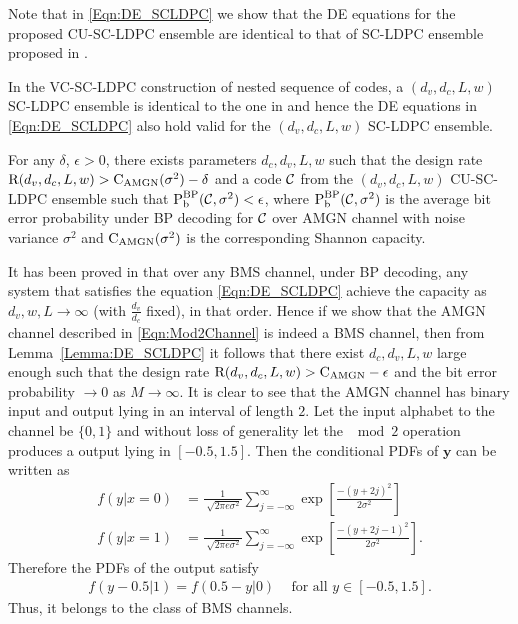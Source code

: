 \documentclass[journal,draftcls,onecolumn,12pt,twoside]{IEEEtran}
\begin{document}
Note that in \eqref{Eqn:DE_SCLDPC} we show that the DE equations for the proposed CU-SC-LDPC ensemble are identical to that of SC-LDPC ensemble proposed in \cite{KudekarUrbanke11,kudekaruniversal}.
\begin{Remark}\label{Rmk:Same_DE}
In the VC-SC-LDPC construction of nested sequence of codes, a $(d_{v},d_{c},L,w)$ SC-LDPC ensemble is identical to the one in \cite{kudekaruniversal} and hence the DE equations in \eqref{Eqn:DE_SCLDPC} also hold valid for the $(d_{v},d_{c},L,w)$ SC-LDPC ensemble.
\end{Remark}

\begin{lemma}\label{Lemma:BMSProof1}
For any $\delta$, $\epsilon>0$, there exists parameters $d_{c},d_{v},L,w$ such that the design rate $\text{R}(d_{v},d_{c},L,w)>\text{C}_{\text{AMGN}}(\sigma^{2})-\delta$ and a code $\mathcal{C}$ from the  $(d_{v},d_{c},L,w)$ CU-SC-LDPC  ensemble such that $\text{P}_{\text{b}}^{\text{BP}}(\mathcal{C},\sigma^{2})< \epsilon$, where $\text{P}_{\text{b}}^{\text{BP}}(\mathcal{C},\sigma^{2})$ is the average bit error probability under BP decoding for $\mathcal{C}$ over AMGN channel with noise variance $\sigma^{2}$ and $\text{C}_{\text{AMGN}}(\sigma^{2})$ is the corresponding Shannon capacity.
\end{lemma}
\begin{IEEEproof}
It has been proved in \cite{kudekaruniversal,kumar2012proof} that over any BMS channel, under BP decoding, any system that satisfies the equation \eqref{Eqn:DE_SCLDPC} achieve the capacity as $d_{v},w,L \rightarrow \infty$ (with $\frac{d_{v}}{d_{c}}$ fixed), in that order. Hence if we show that the AMGN channel described in \eqref{Eqn:Mod2Channel} is indeed a BMS channel, then from Lemma~\ref{Lemma:DE_SCLDPC} it follows that there exist $d_{c},d_{v},L,w$ large enough such that the design rate $\text{R}(d_{v},d_{c},L,w)>\text{C}_{\text{AMGN}}-\epsilon$ and the bit error probability $\rightarrow 0$  as $M\rightarrow \infty$. It is clear to see that the AMGN channel has binary input and output lying in an interval of length $2$. Let the input alphabet to the channel be $\{0,1\}$ and without loss of generality let the $\mod 2$ operation produces a output lying in $[-0.5,  1.5]$. Then the conditional PDFs of $\mathbf{y}$ can be written as
\begin{align}
f(y|x=0)&=\frac{1}{\sqrt[]{2\pi e\sigma^{2}}}\sum_{j=-\infty}^{\infty}\exp\left[\frac{ -(y+2j)^{2}}{2\sigma^{2}}\right]\\
f(y|x=1)&=\frac{1}{\sqrt[]{2\pi e\sigma^{2}}}\sum_{j=-\infty}^{\infty}\exp\left[\frac{ -(y+2j-1)^{2}}{2\sigma^{2}}\right].
\end{align}
Therefore the PDFs of the output satisfy
\begin{align*}
f(y-0.5|1)=f(0.5-y|0) \hspace{10pt} \text{ for all } y\in [-0.5, 1.5].
\end{align*}
Thus, it belongs to the class of BMS channels.
\end{IEEEproof}
\end{document}
